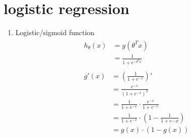 \documentclass[12pt]{ctexart}%
\begin{document}
	\section{\quad logistic regression}
		\begin{enumerate}
			\item Logistic/sigmoid function
				\begin{align}
					\begin{split}
						h_\theta(x) &= g(\theta^T x) \\
									&= \frac{1}{1+e^{-\theta^T x}}
					\end{split}\\
					\begin{split}
						g'(x) &= (\frac{1}{1+e^{-x}})' \\
							  &= \frac{e^{-x}}{(1+e^{-x})^2}\\
							  &= \frac{1}{1+e^{-x}}\cdot\frac{e^{-x}}{1+e^{-x}}\\
							  &= \frac{1}{1+e^{-x}}\cdot(1 - \frac{1}{1+e{-x}})\\
							  &= g(x)\cdot (1-g(x))
					\end{split}\\
				\end{align}
			

\end{enumerate}
\end{document}
